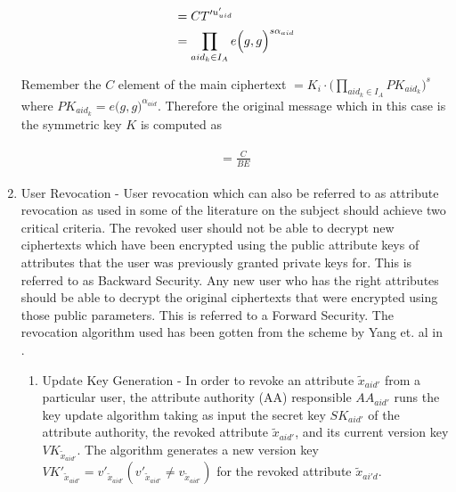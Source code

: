 \begin{enumerate}
	\begin{align}
	\begin{split}
	&= CT'^{u'_{uid}} \\ &= \prod\limits_{aid_{k} \in I_{A}} e\Bigl(g, g\Bigl)^{s\alpha_{aid}}
	\end{split}
	\end{align}
	
	Remember the $C$ element of the main ciphertext $= K_i\cdot\bigl(\prod\limits_{aid_{k} \in I_{A}}PK_{aid_{k}}\bigl)^{s}$ where $PK_{aid_{k}} = e\bigl(g, g\bigl)^{\alpha_{aid}}$. Therefore the original message which in this case is the symmetric key $K$ is computed as
	
	\begin{align}
	\begin{split}
	= \frac{C}{BE}
	\end{split}
	\end{align}
	
	\item User Revocation - User revocation which can also be referred to as attribute revocation as used in some of the literature on the subject should achieve two critical criteria. The revoked user should not be able to decrypt new ciphertexts which have been encrypted using the public attribute keys of attributes that the user was previously granted private keys for. This is referred to as Backward Security. Any new user who has the right attributes should be able to decrypt the original ciphertexts that were encrypted using those public parameters. This is referred to a Forward Security. The revocation algorithm used has been gotten from the scheme by Yang et. al in \cite{Yang2014}.
	
	
	\begin{enumerate}
		\item Update Key Generation - In order to revoke an attribute $\tilde{x}_{aid'}$ from a particular user, the attribute authority (AA) responsible $AA_{aid'}$ runs the key update algorithm taking as input the secret key $SK_{aid'}$ of the 
		attribute authority, the revoked attribute $\tilde{x}_{aid'}$, and its current version key $VK_{\tilde{x}_{aid'}}$.
		The algorithm generates a new version key $VK'_{\tilde{x}_{aid'}} = v'_{\tilde{x}_{aid'}} (v'_{\tilde{x}_{aid'}} \neq v_{\tilde{x}_{aid'}})$ for the revoked attribute $\tilde{x}_{ai'd}$.
		

\end{enumerate}
\end{enumerate}
